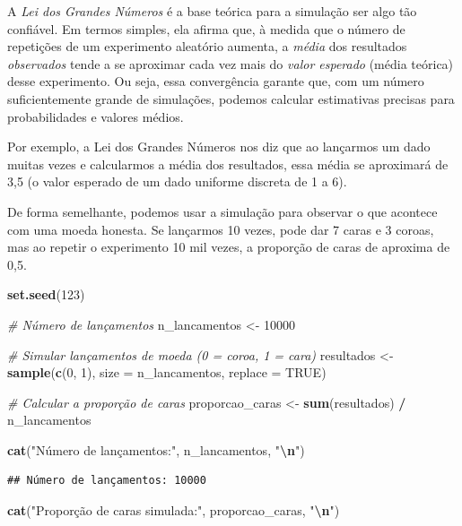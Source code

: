 \documentclass[
]{book}
\newenvironment{Shaded}{\begin{snugshade}}{\end{snugshade}}
\newcommand{\AttributeTok}[1]{\textcolor[rgb]{0.13,0.29,0.53}{#1}}
\newcommand{\CommentTok}[1]{\textcolor[rgb]{0.56,0.35,0.01}{\textit{#1}}}
\newcommand{\ConstantTok}[1]{\textcolor[rgb]{0.56,0.35,0.01}{#1}}
\newcommand{\DecValTok}[1]{\textcolor[rgb]{0.00,0.00,0.81}{#1}}
\newcommand{\FunctionTok}[1]{\textcolor[rgb]{0.13,0.29,0.53}{\textbf{#1}}}
\newcommand{\NormalTok}[1]{#1}
\newcommand{\OtherTok}[1]{\textcolor[rgb]{0.56,0.35,0.01}{#1}}
\newcommand{\SpecialCharTok}[1]{\textcolor[rgb]{0.81,0.36,0.00}{\textbf{#1}}}
\newcommand{\StringTok}[1]{\textcolor[rgb]{0.31,0.60,0.02}{#1}}
\begin{document}
A \emph{Lei dos Grandes Números} é a base teórica para a simulação ser algo tão confiável. Em termos simples, ela afirma que, à medida que o número de repetições de um experimento aleatório aumenta, a \emph{média} dos resultados \emph{observados} tende a se aproximar cada vez mais do \emph{valor esperado} (média teórica) desse experimento. Ou seja, essa convergência garante que, com um número suficientemente grande de simulações, podemos calcular estimativas precisas para probabilidades e valores médios.

Por exemplo, a Lei dos Grandes Números nos diz que ao lançarmos um dado muitas vezes e calcularmos a média dos resultados, essa média se aproximará de 3,5 (o valor esperado de um dado uniforme discreta de 1 a 6).

De forma semelhante, podemos usar a simulação para observar o que acontece com uma moeda honesta. Se lançarmos 10 vezes, pode dar 7 caras e 3 coroas, mas ao repetir o experimento 10 mil vezes, a proporção de caras de aproxima de 0,5.

\begin{Shaded}
\begin{Highlighting}[]
\FunctionTok{set.seed}\NormalTok{(}\DecValTok{123}\NormalTok{)}

\CommentTok{\# Número de lançamentos}
\NormalTok{n\_lancamentos }\OtherTok{\textless{}{-}} \DecValTok{10000}

\CommentTok{\# Simular lançamentos de moeda (0 = coroa, 1 = cara)}
\NormalTok{resultados }\OtherTok{\textless{}{-}} \FunctionTok{sample}\NormalTok{(}\FunctionTok{c}\NormalTok{(}\DecValTok{0}\NormalTok{, }\DecValTok{1}\NormalTok{), }\AttributeTok{size =}\NormalTok{ n\_lancamentos, }\AttributeTok{replace =} \ConstantTok{TRUE}\NormalTok{)}

\CommentTok{\# Calcular a proporção de caras}
\NormalTok{proporcao\_caras }\OtherTok{\textless{}{-}} \FunctionTok{sum}\NormalTok{(resultados) }\SpecialCharTok{/}\NormalTok{ n\_lancamentos}

\FunctionTok{cat}\NormalTok{(}\StringTok{"Número de lançamentos:"}\NormalTok{, n\_lancamentos, }\StringTok{"}\SpecialCharTok{\textbackslash{}n}\StringTok{"}\NormalTok{)}
\end{Highlighting}
\end{Shaded}

\begin{verbatim}
## Número de lançamentos: 10000
\end{verbatim}

\begin{Shaded}
\begin{Highlighting}[]
\FunctionTok{cat}\NormalTok{(}\StringTok{"Proporção de caras simulada:"}\NormalTok{, proporcao\_caras, }\StringTok{"}\SpecialCharTok{\textbackslash{}n}\StringTok{"}\NormalTok{)}
\end{Highlighting}
\end{Shaded}
\end{document}
